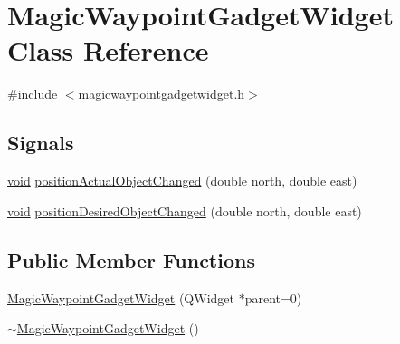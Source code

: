 \hypertarget{class_magic_waypoint_gadget_widget}{\section{\-Magic\-Waypoint\-Gadget\-Widget \-Class \-Reference}
\label{class_magic_waypoint_gadget_widget}
}


{\ttfamily \#include $<$magicwaypointgadgetwidget.\-h$>$}

\subsection*{\-Signals}
\begin{DoxyCompactItemize}
\item 
\hyperlink{group___u_a_v_objects_plugin_ga444cf2ff3f0ecbe028adce838d373f5c}{void} \hyperlink{group___g_c_s_control_gadget_plugin_gabd9554a73e1a5f9370d4aefabc29cc96}{position\-Actual\-Object\-Changed} (double north, double east)
\item 
\hyperlink{group___u_a_v_objects_plugin_ga444cf2ff3f0ecbe028adce838d373f5c}{void} \hyperlink{group___g_c_s_control_gadget_plugin_ga923489d0d3e251a031fdc66ce20d411b}{position\-Desired\-Object\-Changed} (double north, double east)
\end{DoxyCompactItemize}
\subsection*{\-Public \-Member \-Functions}
\begin{DoxyCompactItemize}
\item 
\hyperlink{group___g_c_s_control_gadget_plugin_ga6b1ff9f71795c087e84d4d30b1a60c6d}{\-Magic\-Waypoint\-Gadget\-Widget} (\-Q\-Widget $\ast$parent=0)
\item 
\hyperlink{group___g_c_s_control_gadget_plugin_ga2ffd0cf503fdefb31aa45a42b5cf63ba}{$\sim$\-Magic\-Waypoint\-Gadget\-Widget} ()
\end{DoxyCompactItemize}
